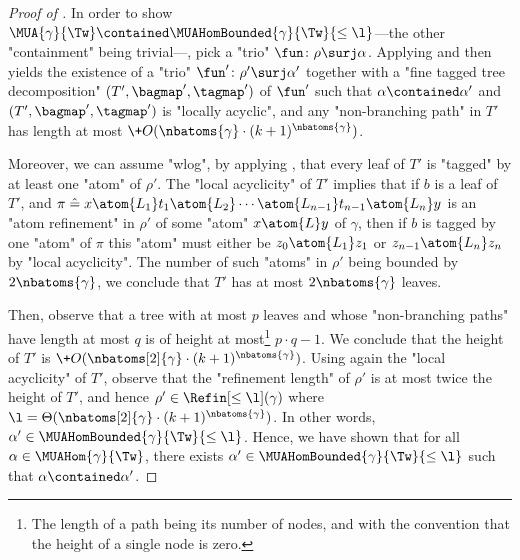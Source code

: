 \begin{proof}[Proof of ]
    In order to show $\MUA{\gamma}{\Tw} \contained \MUAHomBounded{\gamma}{\Tw}{\leq\l}$---the other
    "containment" being trivial---, pick a "trio" $\fun\colon \rho \surj \alpha$.
    Applying  and then 
    yields the existence of a "trio" $\fun'\colon \rho' \surj \alpha'$ together
    with a "fine tagged tree decomposition" $(T', \bagmap', \tagmap')$ of $\fun'$
    such that $\alpha \contained \alpha'$ and $(T', \bagmap', \tagmap')$ is "locally acyclic",
    and any "non-branching path" in $T'$ has length at most
    $\+O(\nbatoms{\gamma}\cdot (k+1)^{\nbatoms{\gamma}})$.

    Moreover, we can assume "wlog", by applying ,
    that every leaf of $T'$ is "tagged" by at least one "atom" of $\rho'$.
    The "local acyclicity" of $T'$ implies that if $b$ is a leaf of $T'$,
    and
    $
        \pi \defeq x \atom{L_1} t_1 \atom{L_2} \cdots \atom{L_{n-1}} t_{n-1} \atom{L_n} y
    $
    is an "atom refinement" in $\rho'$ of some "atom" $x \atom{L} y$ of $\gamma$,
    then if $b$ is tagged by one "atom" of $\pi$ this "atom" must either be $z_0 \atom{L_1} z_1$
    or $z_{n-1} \atom{L_n} z_n$ by "local acyclicity".
    The number of such "atoms" in $\rho'$ being bounded by $2\nbatoms{\gamma}$, we conclude that
    $T'$ has at most $2\nbatoms{\gamma}$ leaves.

    Then, observe that a tree with at most $p$ leaves and whose "non-branching paths"
    have length at most $q$ is of height at most\footnote{The length of a path being its number of nodes,
    and with the convention that the height of a single node is zero.} $p\cdot q - 1$. We
    conclude that the height of $T'$ is 
    $\+O(\nbatoms[2]{\gamma}\cdot (k+1)^{\nbatoms{\gamma}})$.
    Using again the "local acyclicity" of $T'$, observe that the "refinement length" of $\rho'$
    is at most twice the height of $T'$, and hence $\rho' \in \Refin[\leq \l](\gamma)$
    where $\l = \Theta(\nbatoms[2]{\gamma}\cdot (k+1)^{\nbatoms{\gamma}})$.
    In other words, $\alpha' \in \MUAHomBounded{\gamma}{\Tw}{\leq\l}$.
    Hence, we have shown that for all $\alpha \in \MUAHom{\gamma}{\Tw}$,
    there exists $\alpha' \in \MUAHomBounded{\gamma}{\Tw}{\leq\l}$ such that $\alpha \contained \alpha'$.
\end{proof}


